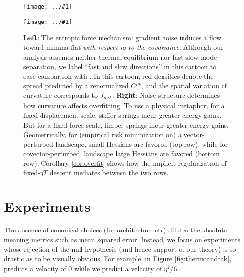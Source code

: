 \documentclass{article}
\theoremstyle{plain}
\theoremstyle{definition}
\newcommand{\plotmooh}[3]{
    \texttt{[image: ../\#1]}
}
\begin{document}
        \begin{figure}[h!]
            \centering
            \plotmooh{diagrams/entropic-force-diagram}{}{0.35\columnwidth} 
            \plotmooh{diagrams/springs}{}{0.35\columnwidth}
            \caption{
                {\bf Left}:
                    The entropic force mechanism: gradient noise induces a flow
                    toward minima flat \emph{with respect to to the
                    covariance}.  Although our analysis assumes neither thermal
                    equilibrium nor fast-slow mode separation, we label ``fast
                    and slow directions'' in this cartoon to ease comparison
                    with \citet{we19b}.  In this cartoon, red densities denote
                    the spread predicted by a renormalized $C^{\mu\nu}$, and
                    the spatial variation of curvature corresponds to
                    $J_{\mu\nu\lambda}$. 
                {\bf Right}:
                    Noise structure determines how curvature affects
                    overfitting.  To use a physical metaphor, for a fixed
                    displacement scale, stiffer springs incur greater energy
                    gains.  But for a fixed force scale, limper springs incur
                    greater energy gains.  Geometrically, for (empirical risk
                    minimization on) a vector-perturbed landscape, small
                    Hessians are favored (top row), while for
                    covector-perturbed, landscape large Hessians are favored
                    (bottom row).  Corollary \ref{cor:overfit} shows how the
                    implicit regularization of fixed-$\eta T$ descent mediates
                    between the two rows.
            }
            \label{fig:cubicandspring}
        \end{figure}


\section{Experiments}

    The absence of canonical choices (for architecture etc) dilutes the
    absolute meaning metrics  such as mean squared error.  Instead, we focus on
    experiments whose rejection of the null hypothesis (and hence support of
    our theory) is so drastic as to be visually obvious.  For example, in
    Figure \ref{fig:thermoandtak}, \citep{ch18} predicts a velocity of $0$
    while we predict a velocity of $\eta^2/6$.  
\end{document}
